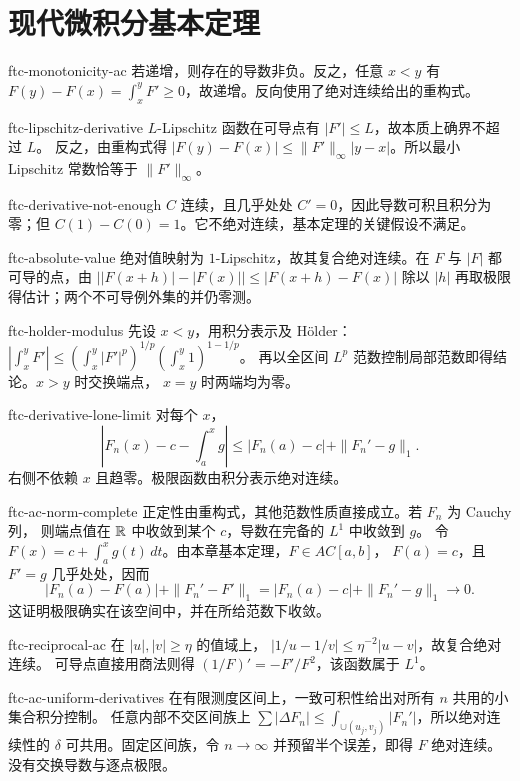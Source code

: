 \chapter{现代微积分基本定理}
\begin{solution}{ftc-monotonicity-ac}
若递增，则存在的导数非负。反之，任意 \(x<y\) 有
\(F(y)-F(x)=\int_x^yF'\ge0\)，故递增。反向使用了绝对连续给出的重构式。
\end{solution}
\begin{solution}{ftc-lipschitz-derivative}
\(L\)-Lipschitz 函数在可导点有 \(|F'|\le L\)，故本质上确界不超过 \(L\)。
反之，由重构式得 \(|F(y)-F(x)|\le\|F'\|_\infty|y-x|\)。所以最小
Lipschitz 常数恰等于 \(\|F'\|_\infty\)。
\end{solution}
\begin{solution}{ftc-derivative-not-enough}
\(C\) 连续，且几乎处处 \(C'=0\)，因此导数可积且积分为零；但
\(C(1)-C(0)=1\)。它不绝对连续，基本定理的关键假设不满足。
\end{solution}
\begin{solution}{ftc-absolute-value}
绝对值映射为 \(1\)-Lipschitz，故其复合绝对连续。在 \(F\) 与 \(|F|\)
都可导的点，由
\(\bigl||F(x+h)|-|F(x)|\bigr|\le|F(x+h)-F(x)|\)
除以 \(|h|\) 再取极限得估计；两个不可导例外集的并仍零测。
\end{solution}
\begin{solution}{ftc-holder-modulus}
先设 \(x<y\)，用积分表示及 Hölder：
\(|\int_x^yF'|\le(\int_x^y|F'|^p)^{1/p}(\int_x^y1)^{1-1/p}\)。
再以全区间 \(L^p\) 范数控制局部范数即得结论。\(x>y\) 时交换端点，
\(x=y\) 时两端均为零。
\end{solution}
\begin{solution}{ftc-derivative-lone-limit}
对每个 \(x\)，
\[
 |F_n(x)-c-\int_a^xg|\le|F_n(a)-c|+\|F_n'-g\|_1.
\]
右侧不依赖 \(x\) 且趋零。极限函数由积分表示绝对连续。
\end{solution}
\begin{solution}{ftc-ac-norm-complete}
正定性由重构式，其他范数性质直接成立。若 \(F_n\) 为 Cauchy 列，
则端点值在 \(\mathbb{R}\) 中收敛到某个 \(c\)，导数在完备的 \(L^1\) 中收敛到 \(g\)。
令 \(F(x)=c+\int_a^xg(t)\,dt\)。由本章基本定理，\(F\in AC[a,b]\)，
\(F(a)=c\)，且 \(F'=g\) 几乎处处，因而
\[
 |F_n(a)-F(a)|+\|F_n'-F'\|_1
 =|F_n(a)-c|+\|F_n'-g\|_1\longrightarrow0.
\]
这证明极限确实在该空间中，并在所给范数下收敛。
\end{solution}
\begin{solution}{ftc-reciprocal-ac}
在 \(|u|,|v|\ge\eta\) 的值域上，
\(|1/u-1/v|\le\eta^{-2}|u-v|\)，故复合绝对连续。
可导点直接用商法则得 \((1/F)'=-F'/F^2\)，该函数属于 \(L^1\)。
\end{solution}
\begin{solution}{ftc-ac-uniform-derivatives}
在有限测度区间上，一致可积性给出对所有 \(n\) 共用的小集合积分控制。
任意内部不交区间族上
\(\sum|\Delta F_n|\le\int_{\cup(u_j,v_j)}|F_n'|\)，所以绝对连续性的
\(\delta\) 可共用。固定区间族，令 \(n\to\infty\) 并预留半个误差，即得
\(F\) 绝对连续。没有交换导数与逐点极限。
\end{solution}
